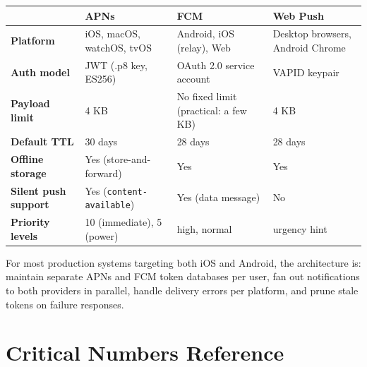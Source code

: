 \documentclass[11pt,a4paper]{article}
\begin{document}
\begin{center}
\renewcommand{\arraystretch}{1.3}
\begin{tabular}{>{\bfseries}p{3.2cm}p{3.5cm}p{3.5cm}p{3.5cm}}
\toprule
 & \textbf{APNs} & \textbf{FCM} & \textbf{Web Push} \\
\midrule
Platform & iOS, macOS, watchOS, tvOS & Android, iOS (relay), Web & Desktop browsers, Android Chrome \\
Auth model & JWT (.p8 key, ES256) & OAuth 2.0 service account & VAPID keypair \\
Payload limit & 4 KB & No fixed limit (practical: a few KB) & 4 KB \\
Default TTL & 30 days & 28 days & 28 days \\
Offline storage & Yes (store-and-forward) & Yes & Yes \\
Silent push support & Yes (\texttt{content-available}) & Yes (data message) & No \\
Priority levels & 10 (immediate), 5 (power) & high, normal & urgency hint \\
\bottomrule
\end{tabular}
\end{center}

For most production systems targeting both iOS and Android, the architecture is: maintain separate APNs and FCM token databases per user, fan out notifications to both providers in parallel, handle delivery errors per platform, and prune stale tokens on failure responses.

\section{Critical Numbers Reference}
\end{document}
